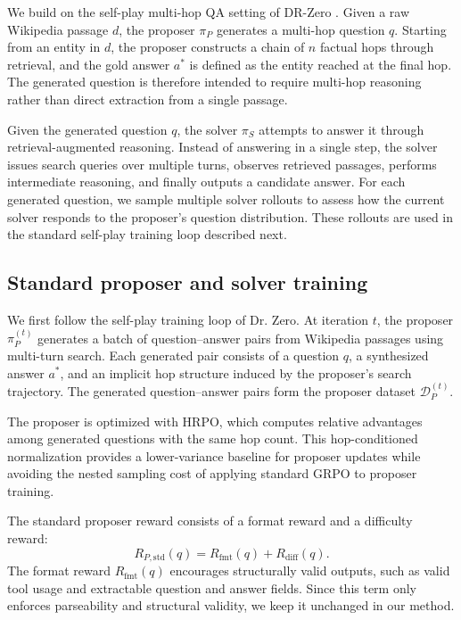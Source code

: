\documentclass{article}
\begin{document}
We build on the self-play multi-hop QA setting of DR-Zero \cite{drzero}. Given a raw Wikipedia passage $d$, the proposer $\pi_P$ generates a multi-hop question $q$. Starting from an entity in $d$, the proposer constructs a chain of $n$ factual hops through retrieval, and the gold answer $a^\ast$ is defined as the entity reached at the final hop. The generated question is therefore intended to require multi-hop reasoning rather than direct extraction from a single passage.

Given the generated question $q$, the solver $\pi_S$ attempts to answer it through retrieval-augmented reasoning. Instead of answering in a single step, the solver issues search queries over multiple turns, observes retrieved passages, performs intermediate reasoning, and finally outputs a candidate answer. For each generated question, we sample multiple solver rollouts to assess how the current solver responds to the proposer's question distribution. These rollouts are used in the standard self-play training loop described next.


\subsection{Standard proposer and solver training}

We first follow the self-play training loop of Dr. Zero. At iteration $t$, the
proposer $\pi_P^{(t)}$ generates a batch of question--answer pairs from
Wikipedia passages using multi-turn search. Each generated pair consists of a
question $q$, a synthesized answer $a^\ast$, and an implicit hop structure
induced by the proposer's search trajectory. The generated question--answer
pairs form the proposer dataset $\mathcal{D}_P^{(t)}$.

The proposer is optimized with HRPO, which computes relative advantages among
generated questions with the same hop count. This hop-conditioned normalization
provides a lower-variance baseline for proposer updates while avoiding the
nested sampling cost of applying standard GRPO to proposer training.

The standard proposer reward consists of a format reward and a difficulty
reward:
\[
R_{P,\mathrm{std}}(q)
=
R_{\mathrm{fmt}}(q)
+
R_{\mathrm{diff}}(q).
\]
The format reward $R_{\mathrm{fmt}}(q)$ encourages structurally valid outputs,
such as valid tool usage and extractable question and answer fields. Since this
term only enforces parseability and structural validity, we keep it unchanged
in our method.
\end{document}
